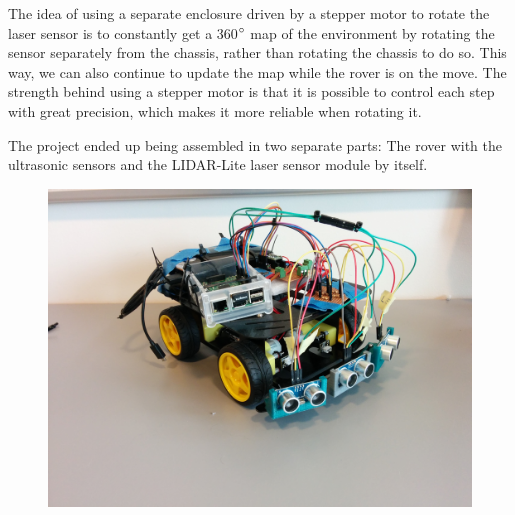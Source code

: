 The idea of using a separate enclosure driven by a stepper motor to rotate the laser sensor is to constantly get a 360$\degree$ map of the environment by rotating the sensor separately from the chassis, rather than rotating the chassis to do so. This way, we can also continue to update the map while the rover is on the move. The strength behind using a stepper motor is that it is possible to control each step with great precision, which makes it more reliable when rotating it.

The project ended up being assembled in two separate parts: The rover with the ultrasonic sensors and the LIDAR-Lite laser sensor module by itself.

\begin{figure}[H]
	\centering
	\includegraphics[width=.6\linewidth]{images/build_ultrasonic.jpg}
\end{figure}